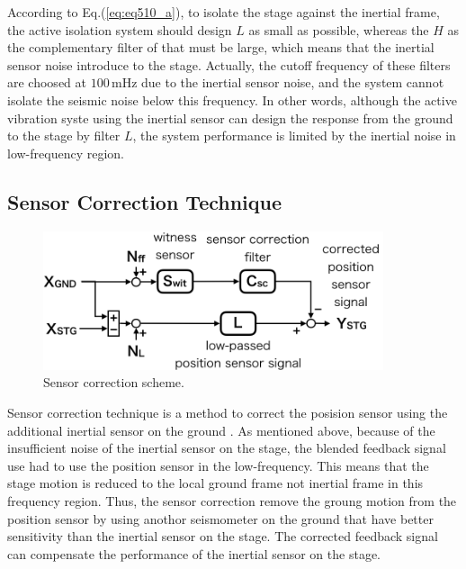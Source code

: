 According to Eq.(\ref{eq:eq510_a}), to isolate the stage against the inertial frame, the active isolation system should design $L$ as small as possible, whereas the $H$ as the complementary filter of that must be large, which means that the inertial sensor noise introduce to the stage. Actually, the cutoff frequency of these filters are choosed at $100\,\mathrm{mHz}$ due to the inertial sensor noise, and the system cannot isolate the seismic noise below this frequency. In other words, although the active vibration syste using the inertial sensor can design the response from the ground to the stage by filter $L$, the system performance is limited by the inertial noise in low-frequency region.

\subsection{Sensor Correction Technique}
\begin{figure}[h]
  \begin{center}   
    \includegraphics[width=10cm]{./img_chap5/img505.png}
    \caption{Sensor correction scheme.} \label{img:img505}
  \end{center}
\end{figure}
Sensor correction technique is a method to correct the posision sensor using the additional inertial sensor on the ground \cite{hua2005low}. As mentioned above, because of the insufficient noise of the inertial sensor on the stage, the blended feedback signal use had to use the position sensor in the low-frequency. This means that the stage motion is reduced to the local ground frame not inertial frame in this frequency region. Thus, the sensor correction remove the groung motion from the position sensor by using anothor seismometer on the ground that have better sensitivity than the inertial sensor on the stage. The corrected feedback signal can compensate the performance of the inertial sensor on the stage.

